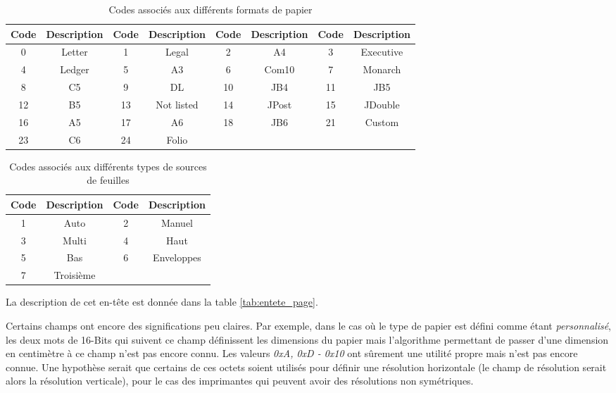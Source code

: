 \begin{table}[ht]
\centering
\begin{tabular}{| c | c || c | c || c | c || c | c |}
\hline
\textbf{Code} & \textbf {Description} & \textbf{Code} & \textbf {Description} &
\textbf{Code} & \textbf {Description} & \textbf{Code} & \textbf {Description} \\
\hline
\hline
0 & Letter & 1 & Legal & 2 & A4 & 3 & Executive \\
4 & Ledger & 5 & A3 & 6 & Com10 & 7 & Monarch \\
8 & C5 & 9 & DL & 10 & JB4 & 11 & JB5 \\
12 & B5 & 13 & Not listed & 14 & JPost & 15 & JDouble \\
16 & A5 & 17 & A6 & 18 & JB6 & 21 & Custom \\
23 & C6 & 24 & Folio & & & &  \\
\hline
\end{tabular}
\caption{Codes associés aux différents formats de papier}
\label{tab:liste_papiers}
\end{table}


\begin{table}[ht]
\centering
\begin{tabular}{| c | c || c | c |}
\hline
\textbf{Code} & \textbf{Description} & \textbf{Code} & \textbf{Description} \\
\hline
\hline
1 & Auto & 2 & Manuel \\
3 & Multi & 4 & Haut \\
5 & Bas & 6 & Enveloppes \\
7 & Troisième & & \\
\hline
\end{tabular}
\caption{Codes associés aux différents types de sources de feuilles}
\label{tab:bac_feuille}
\end{table}

La description de cet en-tête est donnée dans la table \ref{tab:entete_page}.

Certains champs ont encore des significations peu claires. Par exemple, dans
le cas où le type de papier est défini comme étant \emph{personnalisé}, 
les deux mots de 16-Bits qui suivent ce champ définissent les dimensions du
papier mais l'algorithme permettant de passer d'une dimension en centimètre
à ce champ n'est pas encore connu. Les valeurs \emph{0xA, 0xD - 0x10} ont 
sûrement une utilité propre mais n'est pas encore connue. Une hypothèse serait
que certains de ces octets soient utilisés pour définir une résolution
horizontale (le champ de résolution serait alors la résolution verticale), 
pour le cas des imprimantes qui peuvent avoir des résolutions non symétriques.
\bigskip

